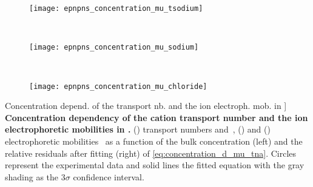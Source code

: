 %
\begin{figure*}[p]
  \centering

  \begin{subfigure}[t]{11cm}
    \centering
    \caption{}\vspace{-1mm}\label{fig:epnpns_concentration_mu_tsodium}
    \texttt{[image: epnpns\_concentration\_mu\_tsodium]}
  \end{subfigure}
  \\
  \begin{subfigure}[t]{11cm}
    \centering
    \caption{}\vspace{-1mm}\label{fig:epnpns_concentration_mu_sodium}
    \texttt{[image: epnpns\_concentration\_mu\_sodium]}
  \end{subfigure}
  \\
  \begin{subfigure}[t]{11cm}
    \centering
    \caption{}\vspace{-1mm}\label{fig:epnpns_concentration_mu_chloride}
    \texttt{[image: epnpns\_concentration\_mu\_chloride]}
  \end{subfigure}

  \caption%
    [Concentration depend. of the  transport nb. and the ion electroph. mob. in ]
    {%
      \textbf{Concentration dependency of the cation transport number and the ion electrophoretic mobilities
      in .}
      ()
      \Na{} transport numbers
      and~\cite{Esteso-1976,Haynes-2017,DellaMonica-1979,Panopoulos-1986,Schonert-2013},
      ()
      \Na{} and
      ()
      \Cl{} electrophoretic mobilities~\cite{Bianchi-1989,Currie-1960,Goldsack-1976,DellaMonica-1979} as a
      function of the bulk  concentration (left) and the relative residuals after fitting (right) of
      \cref{eq:concentration_d_mu_tna}. Circles represent the experimental data and solid lines the fitted
      equation with the gray shading as the $3\sigma$ confidence interval.
  }\label{fig:epnpns_concentration_mu}
\end{figure*}
%


